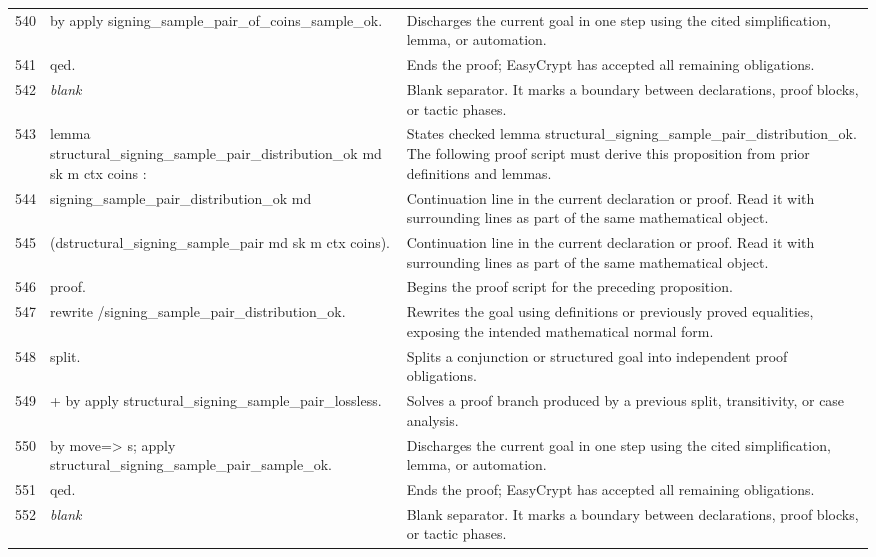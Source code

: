 \documentclass[10pt]{article}
\begin{document}
\begin{longtable}{r L{0.53\textwidth} L{0.37\textwidth}}
540 & {\ttfamily\scriptsize by apply signing\_sample\_pair\_of\_coins\_sample\_ok.} & Discharges the current goal in one step using the cited simplification, lemma, or automation. \\
541 & {\ttfamily\scriptsize qed.} & Ends the proof; EasyCrypt has accepted all remaining obligations. \\
542 & {\ttfamily\scriptsize \emph{blank}} & Blank separator.  It marks a boundary between declarations, proof blocks, or tactic phases. \\
543 & {\ttfamily\scriptsize lemma structural\_signing\_sample\_pair\_distribution\_ok md sk m ctx coins :} & States checked lemma structural\_signing\_sample\_pair\_distribution\_ok.  The following proof script must derive this proposition from prior definitions and lemmas. \\
544 & {\ttfamily\scriptsize   signing\_sample\_pair\_distribution\_ok md} & Continuation line in the current declaration or proof.  Read it with surrounding lines as part of the same mathematical object. \\
545 & {\ttfamily\scriptsize     (dstructural\_signing\_sample\_pair md sk m ctx coins).} & Continuation line in the current declaration or proof.  Read it with surrounding lines as part of the same mathematical object. \\
546 & {\ttfamily\scriptsize proof.} & Begins the proof script for the preceding proposition. \\
547 & {\ttfamily\scriptsize rewrite /signing\_sample\_pair\_distribution\_ok.} & Rewrites the goal using definitions or previously proved equalities, exposing the intended mathematical normal form. \\
548 & {\ttfamily\scriptsize split.} & Splits a conjunction or structured goal into independent proof obligations. \\
549 & {\ttfamily\scriptsize + by apply structural\_signing\_sample\_pair\_lossless.} & Solves a proof branch produced by a previous split, transitivity, or case analysis. \\
550 & {\ttfamily\scriptsize by move=> s; apply structural\_signing\_sample\_pair\_sample\_ok.} & Discharges the current goal in one step using the cited simplification, lemma, or automation. \\
551 & {\ttfamily\scriptsize qed.} & Ends the proof; EasyCrypt has accepted all remaining obligations. \\
552 & {\ttfamily\scriptsize \emph{blank}} & Blank separator.  It marks a boundary between declarations, proof blocks, or tactic phases. \\

\end{longtable}
\end{document}
